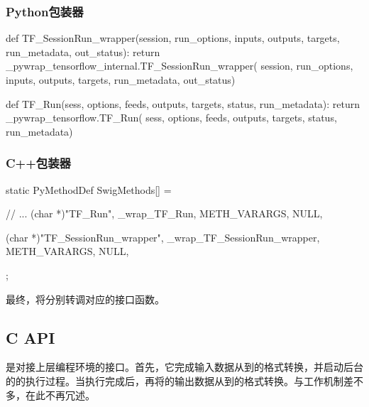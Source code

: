 \begin{content}
\subsubsection{Python包装器}

\begin{leftbar}
\begin{python}[caption={tensorflow/bazel-bin/tensorflow/python/pywrap\_tensorflow\_internal.py}]
def TF_SessionRun_wrapper(session, run_options, inputs, 
  outputs, targets, run_metadata, out_status):
  return _pywrap_tensorflow_internal.TF_SessionRun_wrapper(
    session, run_options, inputs, outputs, targets, run_metadata, out_status)

def TF_Run(sess, options, feeds, outputs, 
  targets, status, run_metadata):
  return _pywrap_tensorflow.TF_Run(
    sess, options, feeds, outputs, targets, status, run_metadata)
\end{python}
\end{leftbar}

\subsubsection{C++包装器}

\begin{leftbar}
\begin{c++}[caption={tensorflow/bazel-bin/tensorflow/python/pywrap\_tensorflow\_internal.cc}]
static PyMethodDef SwigMethods[] = {
  // ...
  { (char *)"TF_Run", 
    _wrap_TF_Run, METH_VARARGS, NULL},

  { (char *)"TF_SessionRun_wrapper", 
    _wrap_TF_SessionRun_wrapper, METH_VARARGS, NULL},
};
\end{c++}
\end{leftbar}

最终，将分别转调对应的接口函数。

\subsection{C API}

是对接上层编程环境的接口。首先，它完成输入数据从到\cpp{}的格式转换，并启动后台的的执行过程。当执行完成后，再将的输出数据从\cpp{}到的格式转换。与工作机制差不多，在此不再冗述。


\end{content}
